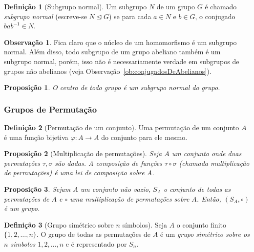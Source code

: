 \documentclass[a4paper,12pt]{report}
\theoremstyle{plain}
\newtheorem{proposicao}{Proposição}[section]
\theoremstyle{definition}
\newtheorem{definicao}{Definição}[section]
\newtheorem{observacao}{Observação}[section]
\begin{document}
\begin{definicao}[Subgrupo normal]
	Um subgrupo \(N\) de um grupo \(G\) é chamado \emph{subgrupo normal} (escreve-se $N\trianglelefteq G$) se para cada \(a\in N\) e \(b\in G\), o conjugado
	\(bab^{-1} \in N\).
\end{definicao}

\begin{observacao}
	Fica claro que o núcleo de um homomorfismo é um subgrupo normal. Além disso, todo subgrupo de um grupo abeliano também é um subgrupo normal, porém, isso não é
	necessariamente verdade em subgrupos de grupos não abelianos (veja Observação~\ref{ob:conjugadosDeAbelianos}). 
\end{observacao}

\begin{proposicao}
	O centro de todo grupo é um subgrupo normal do grupo.
\end{proposicao}

\subsubsection{Grupos de Permutação}

\begin{definicao}[Permutação de um conjunto]
		Uma permutação de um conjunto $A$ é uma função bijetiva $\varphi: A \longrightarrow A$ do conjunto para ele mesmo.
\end{definicao}

\begin{proposicao}[Multiplicação de permutações]\label{def:multpermut}
	Seja $A$ um conjunto onde duas permutações $\tau,\sigma$ são dadas. A composição de funções $\tau\circ\sigma$ (chamada \emph{multiplicação de permutações}) é uma lei de composição sobre A.
\end{proposicao}

\begin{proposicao}
	Sejam $A$ um conjunto não vazio, $S_A$ o conjunto de todas as permutações de $A$ e $\circ$ uma multiplicação de permutações sobre $A$. Então, $(S_A, \circ)$ é um grupo.
\end{proposicao}

\begin{definicao}[Grupo simétrico sobre $n$ símbolos]
	Seja $A$ o conjunto finito $\{1,2,\dots, n\}$. O grupo de todas as permutações de $A$ é um \emph{grupo simétrico sobre os $n$ símbolos $1,2,\dots,n$} e é representado por $S_n$.	
\end{definicao}
\end{document}
